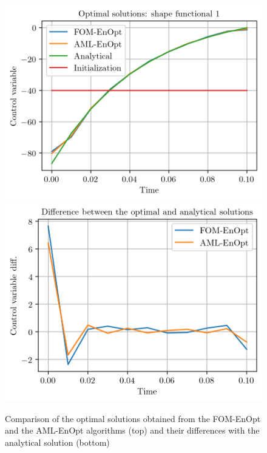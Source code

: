 \begin{figure}
\centering
\includegraphics{Plots/solutions.png}
\includegraphics{Plots/solutionsDiffer.png}
\caption{\label{FOMAMLEnOptSolutionComp}Comparison of the optimal solutions obtained from the FOM-EnOpt and the AML-EnOpt algorithms (top) and their differences with the analytical solution (bottom)}
\end{figure}

